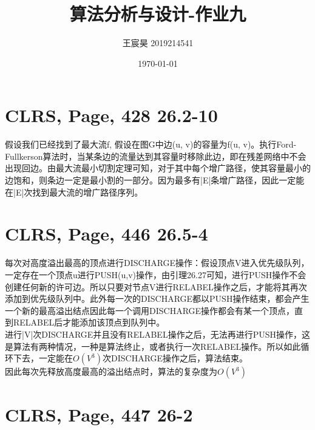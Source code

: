 \documentclass[UTF8]{ctexart}
\title{算法分析与设计-作业九}
\author{王宸昊 2019214541}
\date{\today}
\begin{document}
\maketitle


\section{CLRS, Page, 428 26.2-10}

假设我们已经找到了最大流f, 假设在图G中边(u, v)的容量为f(u, v)。执行Ford-Fullkerson算法时，当某条边的流量达到其容量时移除此边，即在残差网络中不会出现回边。由最大流最小切割定理可知，对于其中每个增广路径，使其容量最小的边饱和，则条边一定是最小割的一部分。因为最多有|E|条增广路径，因此一定能在|E|次找到最大流的增广路径序列。



\section{CLRS, Page, 446 26.5-4}

每次对高度溢出最高的顶点进行DISCHARGE操作：假设顶点V进入优先级队列，一定存在一个顶点u进行PUSH(u,v)操作，由引理26.27可知，进行PUSH操作不会创建任何新的许可边。所以只要对节点V进行RELABEL操作之后，才能将其再次添加到优先级队列中。此外每一次的DISCHARGE都以PUSH操作结束，都会产生一个新的最高溢出结点因此每一个调用DISCHARGE操作都会有某一个顶点，直到RELABEL后才能添加该顶点到队列中。\\
进行|V|次DISCHARGE并且没有RELABEL操作之后，无法再进行PUSH操作，这是算法有两种情况，一种是算法终止，或者执行一次RELABEL操作。所以如此循环下去，一定能在$O(V^3)$次DISCHARGE操作之后，算法结束。\\
因此每次先释放高度最高的溢出结点时，算法的复杂度为$O(V^3)$


\section{CLRS, Page, 447 26-2}
\end{document}
